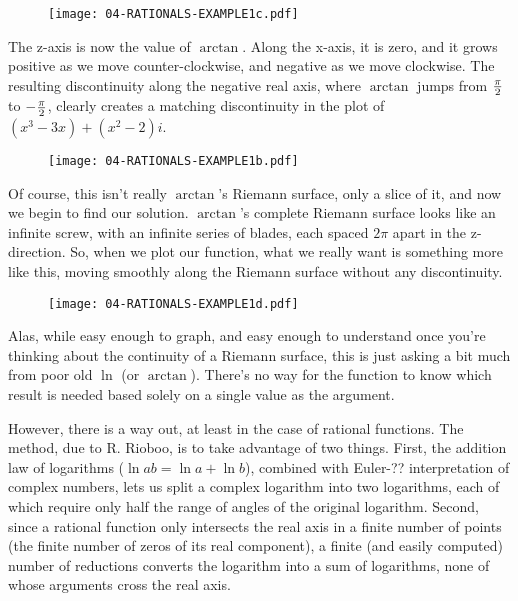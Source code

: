 \begin{figure}[h]
\begin{center}
\texttt{[image: 04-RATIONALS-EXAMPLE1c.pdf]}
\end{center}
\end{figure}

The z-axis is now the value of $\arctan$.  Along the x-axis, it is
zero, and it grows positive as we move counter-clockwise, and negative
as we move clockwise.  The resulting discontinuity along the negative
real axis, where $\arctan$ jumps from $\pi\over2$ to $-{\pi\over2}$,
clearly creates a matching discontinuity in the plot of
$(x^3-3x)+(x^2-2)i$.

\begin{figure}[h]
\begin{center}
\texttt{[image: 04-RATIONALS-EXAMPLE1b.pdf]}
\end{center}
\end{figure}

Of course, this isn't really $\arctan$'s Riemann surface, only a slice
of it, and now we begin to find our solution.  $\arctan$'s complete
Riemann surface looks like an infinite screw, with an infinite series
of blades, each spaced $2\pi$ apart in the z-direction.  So, when we
plot our function, what we really want is something more like this,
moving smoothly along the Riemann surface without any discontinuity.

\begin{figure}[h]
\begin{center}
\texttt{[image: 04-RATIONALS-EXAMPLE1d.pdf]}
\end{center}
\end{figure}

Alas, while easy enough to graph, and easy enough to understand once
you're thinking about the continuity of a Riemann surface, this is
just asking a bit much from poor old $\ln$ (or $\arctan$).  There's no
way for the function to know which result is needed based solely on a
single value as the argument.

However, there is a way out, at least in the case of rational
functions.  The method, due to R. Rioboo, is to take advantage of two
things.  First, the addition law of logarithms ($\ln ab = \ln a + \ln
b$), combined with Euler-?? interpretation of complex numbers, lets us
split a complex logarithm into two logarithms, each of which require
only half the range of angles of the original logarithm.  Second,
since a rational function only intersects the real axis in a finite
number of points (the finite number of zeros of its real component), a
finite (and easily computed) number of reductions converts the
logarithm into a sum of logarithms, none of whose arguments cross
the real axis.

